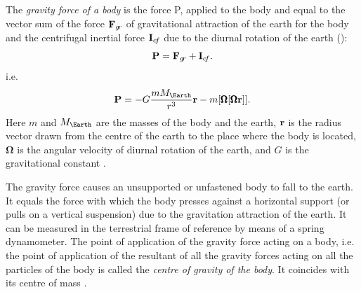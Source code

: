 \subsection{}\label{7.3.2} The \emph{gravity force of a body} is the force P, applied to the body and equal to the vector sum of the force $\vb{F}_{g\!r}$ of gravitational attraction of the earth for the body  and the centrifugal inertial force $\vb{I}_{c\!f}$ due to the diurnal rotation of the earth ():
\begin{equation*}%
\vb{P} = \vb{F}_{g\!r} + \vb{I}_{c\!f}.
\end{equation*}
i.e.
\begin{equation*}%
\vb{P} = - G \frac{mM_{\Earth}}{r^{3}}\vb{r} - m \qty[\pmb{\Omega}[\pmb{\Omega}\vb{r}]].
\end{equation*}
Here $m$ and $M_{\Earth}$ are the masses of the body and the earth, $\vb{r}$ is the radius vector drawn from the centre of the earth to the place where the body is located, $\pmb{\Omega}$ is the angular velocity of diurnal rotation of the earth, and $G$ is the gravitational constant .

The gravity force causes an unsupported or unfastened body to fall to the earth. It equals the force with which the body presses against a horizontal support (or pulls on a vertical suspension) due to the gravitation attraction of the earth. It can be measured in the terrestrial frame of reference by means of a spring dynamometer. The point of application of the gravity force acting on a body, i.e. the point of appli­cation of the resultant of all the gravity forces acting on all the particles of the body is called the \emph{centre of gravity of the body}. It coincides with its centre of mass .

